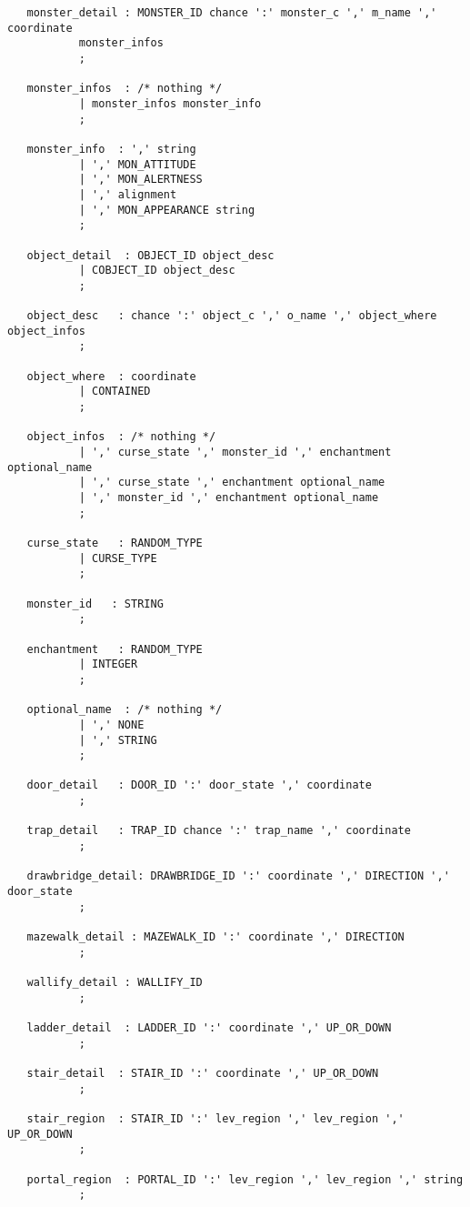 \documentclass[11pt]{article}
\begin{document}
\begin{verbatim}
   monster_detail : MONSTER_ID chance ':' monster_c ',' m_name ',' coordinate
           monster_infos
           ;

   monster_infos  : /* nothing */
           | monster_infos monster_info
           ;

   monster_info  : ',' string
           | ',' MON_ATTITUDE
           | ',' MON_ALERTNESS
           | ',' alignment
           | ',' MON_APPEARANCE string
           ;

   object_detail  : OBJECT_ID object_desc
           | COBJECT_ID object_desc
           ;

   object_desc   : chance ':' object_c ',' o_name ',' object_where object_infos
           ;

   object_where  : coordinate
           | CONTAINED
           ;

   object_infos  : /* nothing */
           | ',' curse_state ',' monster_id ',' enchantment optional_name
           | ',' curse_state ',' enchantment optional_name
           | ',' monster_id ',' enchantment optional_name
           ;

   curse_state   : RANDOM_TYPE
           | CURSE_TYPE
           ;

   monster_id   : STRING
           ;

   enchantment   : RANDOM_TYPE
           | INTEGER
           ;

   optional_name  : /* nothing */
           | ',' NONE
           | ',' STRING
           ;

   door_detail   : DOOR_ID ':' door_state ',' coordinate
           ;

   trap_detail   : TRAP_ID chance ':' trap_name ',' coordinate
           ;

   drawbridge_detail: DRAWBRIDGE_ID ':' coordinate ',' DIRECTION ',' door_state
           ;

   mazewalk_detail : MAZEWALK_ID ':' coordinate ',' DIRECTION
           ;

   wallify_detail : WALLIFY_ID
           ;

   ladder_detail  : LADDER_ID ':' coordinate ',' UP_OR_DOWN
           ;

   stair_detail  : STAIR_ID ':' coordinate ',' UP_OR_DOWN
           ;

   stair_region  : STAIR_ID ':' lev_region ',' lev_region ',' UP_OR_DOWN
           ;

   portal_region  : PORTAL_ID ':' lev_region ',' lev_region ',' string
           ;


\end{verbatim}
\end{document}

